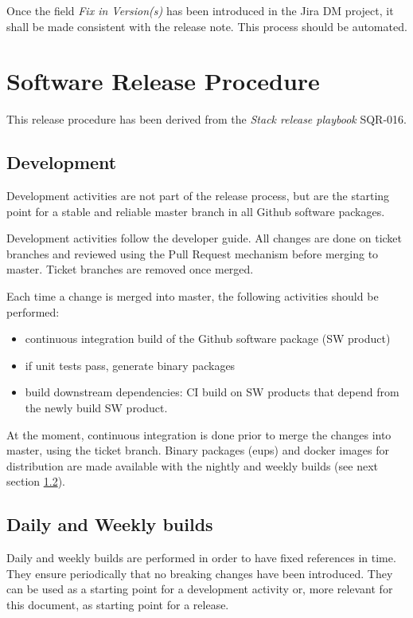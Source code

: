Once the field \textit{Fix in Version(s)} has been introduced in the Jira DM project, it shall be made consistent with the release note. This process should be automated.


\newpage
\section{Software Release Procedure} \label{sec:releaseprocedure}

This release procedure has been derived from the \textit{Stack release playbook} SQR-016.

\subsection{Development} \label{sec:dev}

Development activities are not part of the release process, but are the starting point for a stable and reliable master branch in all Github software packages.

Development activities follow the \citep{DevGuide} developer guide. All changes are done on ticket branches and reviewed using the Pull Request mechanism before merging to master.
Ticket branches are removed once merged.

Each time a change is merged into master, the following activities should be performed:

\begin{itemize}
\item continuous integration build of the Github software package (SW product)
\item if unit tests pass, generate binary packages
\item build downstream dependencies: CI build on SW products that depend from the newly build SW product.
\end{itemize}

At the moment, continuous integration is done prior to merge the changes into master, using the ticket branch. Binary packages (eups) and docker images for distribution are made available with the nightly and weekly builds (see next section \ref{sec:weekly}).


\subsection{Daily and Weekly builds} \label{sec:weekly}

Daily and weekly builds are performed in order to have fixed references in time.
They ensure periodically that no breaking changes have been introduced.
They can be used as a starting point for a development activity or, more relevant for this document, as starting point for a release.

